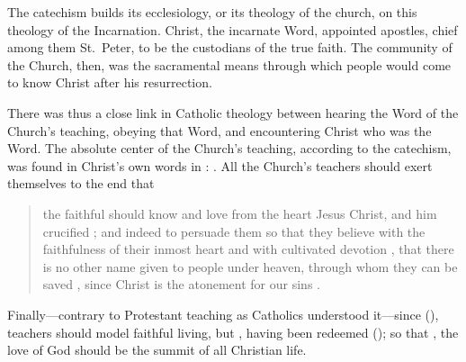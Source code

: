 The catechism builds its ecclesiology, or its theology of the church, on this 
theology of the Incarnation.
Christ, the incarnate Word, appointed apostles, chief among them St.\ Peter, to 
be the custodians of the true faith.
The community of the Church, then, was the sacramental means through which 
people would come to know Christ after his resurrection.

There was thus a close link in Catholic theology between hearing the Word of 
the Church's teaching, obeying that Word, and encountering Christ who was the 
Word.
The absolute center of the Church's teaching, according to the catechism, was 
found in Christ's own words in : .%
   \Autocite
   [6: .]
   {Catholic:Catechismus1614}
All the Church's teachers should exert themselves to the end that 
    \begin{quote}
        the faithful should know and love from the heart Jesus Christ, and him 
        crucified ; and indeed to persuade them so that they 
        believe with the faithfulness  of their inmost heart and 
        with cultivated devotion , that there is no other name 
        given to people under heaven, through whom they can be saved 
        , since Christ is the atonement for our sins 
        .%
            \Autocite
            [6: .]
            {Catholic:Catechismus1614}
    \end{quote}
Finally---contrary to Protestant teaching as Catholics understood it---since 
(), teachers should model faithful living,  but , having been redeemed  
(); so that , the love of God should be the summit of all Christian 
life.%
    \Autocite[6--7: ]
    {Catholic:Catechismus1614}


